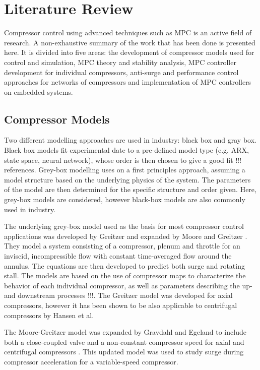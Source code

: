 \chapter{Literature Review}
Compressor control using advanced techniques such as MPC is an active field of research. 
A non-exhaustive summary of the work that has been done is presented here.
It is divided into five areas: the development of compressor models used for control and simulation, MPC theory and stability analysis, MPC controller development for individual compressors, anti-surge and performance control approaches for networks of compressors and implementation of MPC controllers on embedded systems. 

\section{Compressor Models}

Two different modelling approaches are used in industry: black box and gray box. Black box models fit experimental date to a pre-defined model type (e.g. ARX, state space, neural network), whose order is then chosen to give a good fit !!! references. 
Grey-box modelling uses on a first principles approach, assuming a model structure based on the underlying physics of the system. 
The parameters of the model are then determined for the specific structure and order given. 
Here, grey-box models are considered, however black-box models are also commonly used in industry.

The underlying grey-box model used as the basis for most compressor control applications was developed by Greitzer \cite{Greitzer1976} and expanded by Moore and Greitzer \cite{Moore1985}.
They model a system consisting of a compressor, plenum and throttle for an inviscid, incompressible flow with constant time-averaged flow around the annulus. 
The equations are then developed to predict both surge and rotating stall.
The models are based on the use of compressor maps to characterize the behavior of each individual compressor, as well as parameters describing the up- and downstream processes !!!.
The Greitzer model was developed for axial compressors, however it has been shown to be also applicable to centrifugal compressors by Hansen et al. \cite{Hansen1981} 

The Moore-Greitzer model was expanded by Gravdahl and Egeland to include both a close-coupled valve and a non-constant compressor speed for axial and centrifugal compressors \cite{Gravdahl1999}. 
This updated model was used to study surge during compressor acceleration for a variable-speed compressor.

